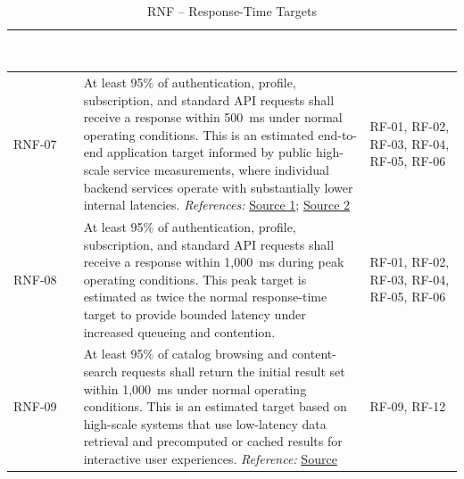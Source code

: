 \documentclass{article}
\begin{document}
\begin{table}[H]

\centering

\small

\renewcommand{\arraystretch}{1.35}

\caption{RNF -- Response-Time Targets}

\label{tab:rnf_response_time}

\begin{tabularx}{\textwidth}{|p{2.2cm}|X|p{3.5cm}|}

\hline

\rowcolor[HTML]{1F2937}

\textcolor{white}{\textbf{Identifier}} &
\textcolor{white}{\textbf{Description}} &
\textcolor{white}{\textbf{RF associated}} \\ \hline

RNF-07 &
At least 95\% of authentication, profile, subscription, and standard API requests shall receive a response within 500~ms under normal operating conditions. This is an estimated end-to-end application target informed by public high-scale service measurements, where individual backend services operate with substantially lower internal latencies.
\textit{References:} \href{https://engineering.atspotify.com/2018/09/scalable-user-privacy}{Source 1}; \href{https://medium.com/netflix-techblog/its-all-a-bout-testing-the-netflix-experimentation-platform-4e1ca458c15a}{Source 2}
&
RF-01, RF-02, RF-03, RF-04, RF-05, RF-06 \\ \hline

RNF-08 &
At least 95\% of authentication, profile, subscription, and standard API requests shall receive a response within 1{,}000~ms during peak operating conditions. This peak target is estimated as twice the normal response-time target to provide bounded latency under increased queueing and contention.
&
RF-01, RF-02, RF-03, RF-04, RF-05, RF-06 \\ \hline

RNF-09 &
At least 95\% of catalog browsing and content-search requests shall return the initial result set within 1{,}000~ms under normal operating conditions. This is an estimated target based on high-scale systems that use low-latency data retrieval and precomputed or cached results for interactive user experiences.
\textit{Reference:} \href{https://medium.com/netflix-techblog/its-all-a-bout-testing-the-netflix-experimentation-platform-4e1ca458c15a}{Source}
&
RF-09, RF-12 \\ \hline


\end{tabularx}
\end{table}
\end{document}
